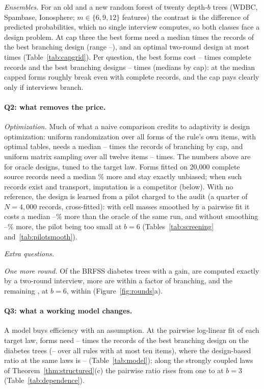 \emph{Ensembles.} For an old and a new random forest of twenty depth-$b$ trees (WDBC, Spambase, Ionosphere; $m\in\{6,9,12\}$ features) the contrast is the difference of predicted probabilities, which no single interview computes, so both classes face a design problem. At cap three the best forms need a median \nCapThreeMed{} times the records of the best branching design (range \nCapThreeMin--\nCapThreeMax), and an optimal two-round design at most \nTwoForestRatioMax{} times (Table~\ref{tab:capgrid}). Per question, the best forms cost \nCapQFixLo--\nCapQFixHi{} times complete records and the best branching designs \nCapQBrLo--\nCapQBrHi{} times (medians by cap): at the median capped forms roughly break even with complete records, and the cap pays clearly only if interviews branch. \nForestScaleSentence

\paragraph{Q2: what removes the price.}
\emph{Optimization.} Much of what a naive comparison credits to adaptivity is design optimization: uniform randomization over all forms of the rule's own items, with optimal tables, needs a median \nUitMedLo--\nUitMedHi{} times the records of branching by cap, and uniform matrix sampling over all twelve items \nUnifLo--\nUnifHi{} times. The numbers above are for oracle designs, tuned to the target law. Forms fitted on 20,000 complete source records need a median \nFitMed\% more and stay exactly unbiased; when such records exist and transport, imputation is a competitor (below). With no reference, the design is learned from a pilot charged to the audit (a quarter of $N=4{,}000$ records, cross-fitted): with cell masses smoothed by a pairwise fit it costs a median \nPilotAllLo--\nPilotAllHi\% more than the oracle of the same run, and without smoothing \nPilotEmpLo--\nPilotEmpHi\% more, the pilot being too small at $b=6$ (Tables~\ref{tab:screening} and~\ref{tab:pilotsmooth}).

\emph{Extra questions.} \nAugSentence

\emph{One more round.} Of the \nScreenGainN{} BRFSS diabetes trees with a gain, \nGainComputable{} are computed exactly by a two-round interview, \nGainExactNon{} more are within a factor \nScreenTwoMax{} of branching, and the remaining \nTwoBounded, at $b=6$, within \nTwoBoundMax{} (Figure~\ref{fig:rounds}a).

\paragraph{Q3: what a working model changes.}
A model buys efficiency with an assumption. \nCiSentence{} At the pairwise log-linear fit of each target law, forms need \nModelTwoLo--\nModelTwoHi{} times the records of the best branching design on the diabetes trees (\nModelAllLo--\nModelAllHi{} over all rules with at most ten items), where the design-based ratio at the same laws is \nModelDesignLo--\nModelDesignHi{} (Table~\ref{tab:model}); along the strongly coupled laws of Theorem~\ref{thm:structured}(c) the pairwise ratio rises from one to \nDepRatioLast{} at $b=3$ (Table~\ref{tab:dependence}).

